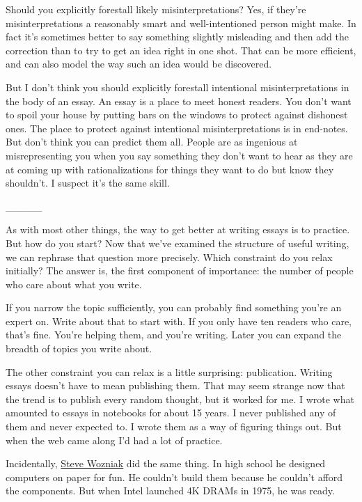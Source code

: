 Should you explicitly forestall likely misinterpretations? Yes, if
they're misinterpretations a reasonably smart and well-intentioned
person might make. In fact it's sometimes better to say something
slightly misleading and then add the correction than to try to get an
idea right in one shot. That can be more efficient, and can also model
the way such an idea would be discovered.

But I don't think you should explicitly forestall intentional
misinterpretations in the body of an essay. An essay is a place to meet
honest readers. You don't want to spoil your house by putting bars on
the windows to protect against dishonest ones. The place to protect
against intentional misinterpretations is in end-notes. But don't think
you can predict them all. People are as ingenious at misrepresenting you
when you say something they don't want to hear as they are at coming up
with rationalizations for things they want to do but know they
shouldn't. I suspect it's the same skill.

\_\_\_\_\_

As with most other things, the way to get better at writing essays is to
practice. But how do you start? Now that we've examined the structure of
useful writing, we can rephrase that question more precisely. Which
constraint do you relax initially? The answer is, the first component of
importance: the number of people who care about what you write.

If you narrow the topic sufficiently, you can probably find something
you're an expert on. Write about that to start with. If you only have
ten readers who care, that's fine. You're helping them, and you're
writing. Later you can expand the breadth of topics you write about.

The other constraint you can relax is a little surprising: publication.
Writing essays doesn't have to mean publishing them. That may seem
strange now that the trend is to publish every random thought, but it
worked for me. I wrote what amounted to essays in notebooks for about 15
years. I never published any of them and never expected to. I wrote them
as a way of figuring things out. But when the web came along I'd had a
lot of practice.

Incidentally,
\href{http://www.foundersatwork.com/steve-wozniak.html}{Steve Wozniak}
did the same thing. In high school he designed computers on paper for
fun. He couldn't build them because he couldn't afford the components.
But when Intel launched 4K DRAMs in 1975, he was ready.


